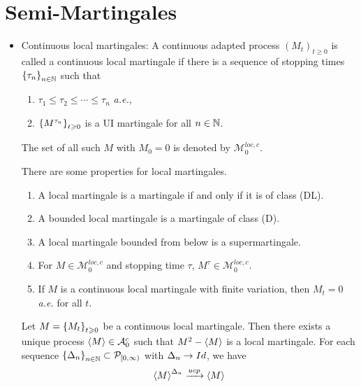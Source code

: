 \documentclass[a4paper,12pt]{article}
\begin{document}
\section{Semi-Martingales}
\begin{itemize}
  \item Continuous local martingales: A continuous adapted process $(M_t)_{t \geqslant 0}$ is called a continuous local martingale if there is a sequence of stopping times $\left\{\tau_n\right\}_{n \in \mathbb{N}}$ such that
  \begin{enumerate}[label=(\arabic*)]
    \item $\tau_1\leqslant \tau_2 \leqslant \cdots \leqslant \tau_n$ \emph{a.e.},
    \item $\left\{M^{\tau_n}\right\}_{t \geqslant 0}$ is a UI martingale for all $n \in \mathbb{N}$.
  \end{enumerate}
  The set of all such $M$ with $M_0 = 0$ is denoted by $\mathcal{M}_0^{loc,c}$.
  \begin{prop}
    There are some properties for local martingales.
    \begin{enumerate}[label=(\arabic*)]
      \item A local martingale is a martingale if and only if it is of class (DL). 
      \item A bounded local martingale is a martingale of class (D).
      \item A local martingale bounded from below is a supermartingale.
      \item For $M \in \mathcal{M}_0^{loc,c}$ and stopping time $\tau$, $M^{\tau} \in \mathcal{M}_0^{loc,c}$.
      \item If $M$ is a continuous local martingale with finite variation, then $M_t = 0$ \emph{a.e.} for all $t$.
    \end{enumerate}
  \end{prop}

  \begin{thm}
    Let $M = \left\{M_t\right\}_{t \geqslant 0}$ be a continuous local martingale. Then there exists a unique process $\left\langle M \right\rangle \in \mathcal{A}_0^c$ such that $M^2 - \left\langle M \right\rangle$ is a local martingale. For each sequence $\left\{\Delta_n\right\}_{n \in \mathbb{N}} \subset \mathcal{P}_{[0,\infty)}$ with $\Delta_n \rightarrow Id$, we have
    \begin{equation*}
      \left\langle M \right\rangle^{\Delta_n} \xrightarrow{ucp} \left\langle M \right\rangle
    \end{equation*}
  \end{thm}


\end{itemize}
\end{document}
